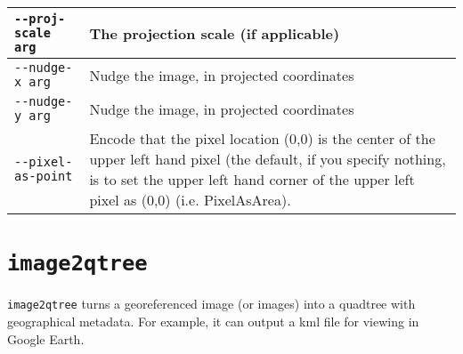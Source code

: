\begin{longtable}{|l|p{8.5cm}|}
\verb#--proj-scale arg# & The projection scale (if applicable) \\ \hline
\verb#--nudge-x arg# & Nudge the image, in projected coordinates \\ \hline
\verb#--nudge-y arg# & Nudge the image, in projected coordinates \\ \hline
\verb#--pixel-as-point# & Encode that the pixel location (0,0) is the center of the upper left hand pixel (the default, if you specify nothing, is to set the upper left hand corner of the upper left pixel as (0,0) (i.e. PixelAsArea). \\ \hline
\end{longtable}

\section{{\tt image2qtree}}\label{sec:image2qtree}

\verb#image2qtree# turns a georeferenced image (or images) into a quadtree with geographical metadata.  For example, it can output a kml file for viewing in Google Earth.

